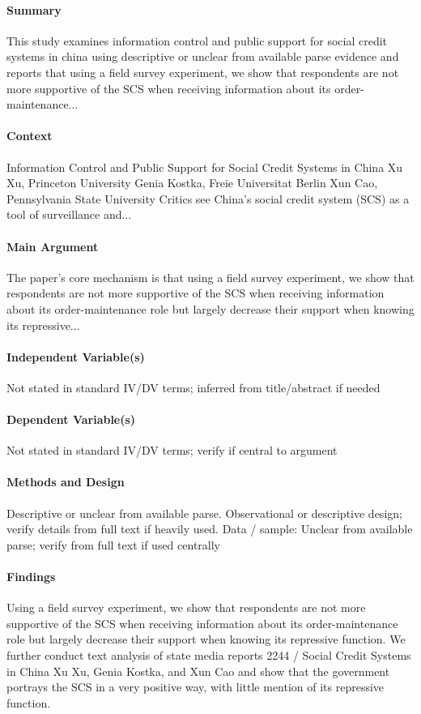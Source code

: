 \documentclass[12pt]{article}
\begin{document}
\paragraph{Summary} This study examines information control and public support for social credit systems in china using descriptive or unclear from available parse evidence and reports that using a field survey experiment, we show that respondents are not more supportive of the SCS when receiving information about its order-maintenance...

\paragraph{Context} Information Control and Public Support for Social Credit Systems in China Xu Xu, Princeton University Genia Kostka, Freie Universitat Berlin Xun Cao, Pennsylvania State University Critics see China's social credit system (SCS) as a tool of surveillance and...

\paragraph{Main Argument} The paper's core mechanism is that using a field survey experiment, we show that respondents are not more supportive of the SCS when receiving information about its order-maintenance role but largely decrease their support when knowing its repressive...

\paragraph{Independent Variable(s)} Not stated in standard IV/DV terms; inferred from title/abstract if needed

\paragraph{Dependent Variable(s)} Not stated in standard IV/DV terms; verify if central to argument

\paragraph{Methods and Design} Descriptive or unclear from available parse. Observational or descriptive design; verify details from full text if heavily used. Data / sample: Unclear from available parse; verify from full text if used centrally

\paragraph{Findings} Using a field survey experiment, we show that respondents are not more supportive of the SCS when receiving information about its order-maintenance role but largely decrease their support when knowing its repressive function. We further conduct text analysis of state media reports 2244 / Social Credit Systems in China Xu Xu, Genia Kostka, and Xun Cao and show that the government portrays the SCS in a very positive way, with little mention of its repressive function.
\end{document}
